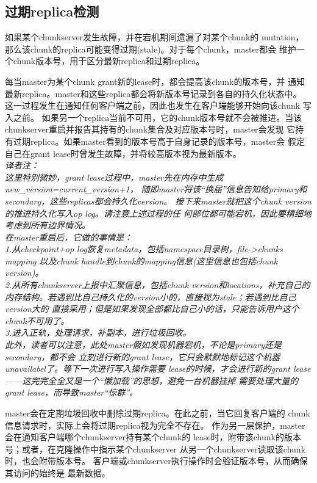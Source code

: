 \subsection{过期replica检测}
如果某个chunkserver发生故障，并在宕机期间遗漏了对某个chunk的
mutation，那么该chunk的replica可能变得过期(stale)。对于每个chunk，master都会
维护一个chunk版本号，用于区分最新replica和过期replica。

每当master为某个chunk grant新的lease时，都会提高该chunk的版本号，并
通知最新replica。master和这些replica都会将新版本号记录到各自的持久化状态中。
这一过程发生在通知任何客户端之前，因此也发生在客户端能够开始向该chunk
写入之前。
如果另一个replica当前不可用，它的chunk版本号就不会被推进。当该
chunkserver重启并报告其持有的chunk集合及对应版本号时，master会发现
它持有过期replica。如果master看到的版本号高于自身记录的版本号，master会
假定自己在grant lease时曾发生故障，并将较高版本视为最新版本。
\emph{
\\译者注：\\
这里特别微妙，grant lease过程中，master先在内存中生成new\_version=current\_version+1，
随即master将该“换届”信息告知给primary和secondary，这些replicas都会持久化version。
接下来master就把这个chunk version的推进持久化写入op log。请注意上述过程的任
何部位都可能宕机，因此要精细地考虑到所有边界情况。
\\在master重启后，它做的事情是：
\\1.从checkpoint+op log恢复metadata，包括namespace目录树，file->chunks mapping
以及chunk handle到chunk的mapping信息(这里信息也包括chunk version)。
\\2.从所有chunkserver上报中汇聚信息，包括chunk version和locations，补充自己的
内存结构。若遇到比自己持久化的version小的，直接视为stale；若遇到比自己version大的
直接采用；但是如果发现全部都比自己小的话，只能告诉用户这个chunk不可用了。
\\3.进入正轨，处理请求，补副本，进行垃圾回收。
\\此外，读者可以注意，此处master假如发现机器宕机，不论是primary还是secondary，都不会
立刻进行新的grant lease，它只会默默地标记这个机器unavailabel了。等下一次进行写入操作需要
lease的时候，才会进行新的grant lease——这完完全全又是一个“懒加载”的思想，避免一台机器挂掉
需要处理大量的grant lease，而导致master“惊群”。
}

master会在定期垃圾回收中删除过期replica。在此之前，当它回复客户端的
chunk信息请求时，实际上会将过期replica视为完全不存在。
作为另一层保护，master会在通知客户端哪个chunkserver持有某个chunk的
lease时，附带该chunk的版本号；或者，在克隆操作中指示某个chunkserver
从另一个chunkserver读取该chunk时，也会附带版本号。
客户端或chunkserver执行操作时会验证版本号，从而确保其访问的始终是
最新数据。